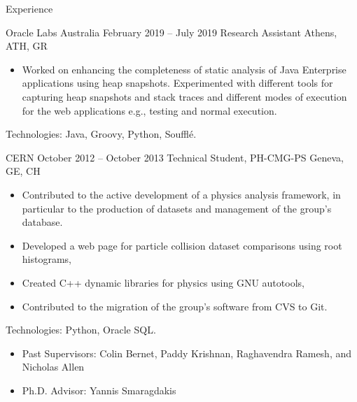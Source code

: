 \documentclass{resume}
\begin{document}
\begin{rSection}{Experience}
\begin{rSubsection}
  {Oracle Labs Australia}
  {February 2019 -- July 2019}
  {Research Assistant}
  {Athens, ATH, GR}
  \begin{itemize}
    \item Worked on enhancing the completeness of static analysis of Java Enterprise applications using heap snapshots. Experimented with different tools for capturing heap snapshots and stack traces and different modes of execution for the web applications e.g., testing and normal execution.
  \end{itemize}
\footnotesize\textcolor{MyColor}{Technologies: Java, Groovy, Python, Soufflé.}
\end{rSubsection}


\begin{rSubsection}
  {CERN}
  {October 2012 -- October 2013}
  {Technical Student, PH-CMG-PS}
  {Geneva, GE, CH}
  \begin{itemize}
    \item Contributed to the active development of a physics analysis framework, in particular to the production of datasets and management of the group's database.
    \item Developed a web page for particle collision dataset comparisons using root histograms,
    \item Created C++ dynamic libraries for physics using GNU autotools,
    \item Contributed to the migration of the group's software from CVS to Git.
  \end{itemize}
  \footnotesize\textcolor{MyColor}{Technologies: Python, Oracle SQL.}
\end{rSubsection}

  \begin{itemize}
    \item Past Supervisors: Colin Bernet, Paddy Krishnan, Raghavendra Ramesh, and Nicholas Allen
    \item Ph.D. Advisor: Yannis Smaragdakis
  \end{itemize}

\end{rSection}

\end{document}
